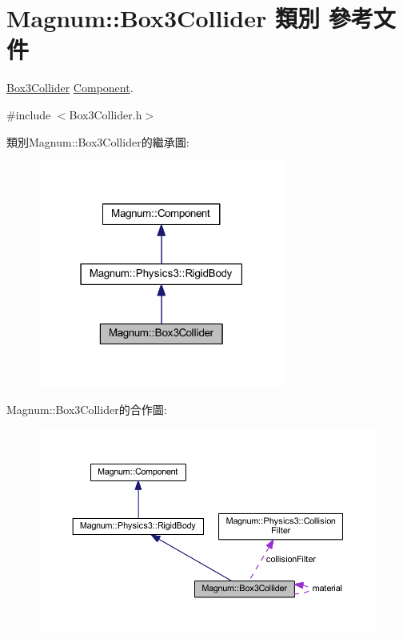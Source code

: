 \hypertarget{class_magnum_1_1_box3_collider}{}\section{Magnum\+:\+:Box3\+Collider 類別 參考文件}
\label{class_magnum_1_1_box3_collider}


\hyperlink{class_magnum_1_1_box3_collider}{Box3\+Collider} \hyperlink{class_magnum_1_1_component}{Component}.  




{\ttfamily \#include $<$Box3\+Collider.\+h$>$}



類別\+Magnum\+:\+:Box3\+Collider的繼承圖\+:\nopagebreak
\begin{figure}[H]
\begin{center}
\leavevmode
\includegraphics[width=231pt]{class_magnum_1_1_box3_collider__inherit__graph}
\end{center}
\end{figure}


Magnum\+:\+:Box3\+Collider的合作圖\+:\nopagebreak
\begin{figure}[H]
\begin{center}
\leavevmode
\includegraphics[width=350pt]{class_magnum_1_1_box3_collider__coll__graph}
\end{center}
\end{figure}
